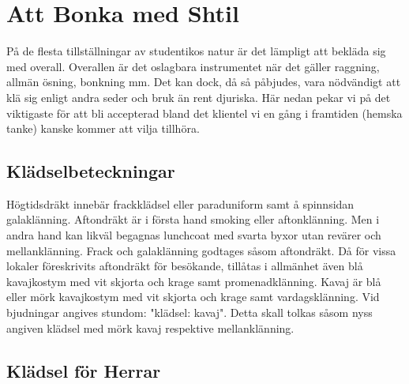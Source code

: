 
\pagestyle{Att Bonka med Shtil}

\section{\textbf{Att Bonka med Shtil}}

    På de flesta tillställningar av studentikos natur är det lämpligt att bekläda sig med overall. Overallen är det oslagbara instrumentet när det gäller raggning, allmän ösning, bonkning  mm. Det kan dock, då så påbjudes, vara nödvändigt att klä sig enligt andra seder och bruk än rent djuriska. Här nedan pekar vi på det viktigaste för att bli accepterad bland det klientel vi en gång i framtiden (hemska tanke) kanske kommer att vilja tillhöra.

    \subsection{\textbf{Klädselbeteckningar}}
    Högtidsdräkt innebär frackklädsel eller paraduniform samt å spinnsidan galaklänning. Aftondräkt är i första hand smoking eller aftonklänning. Men i andra hand kan likväl begagnas lunchcoat med svarta byxor utan revärer och mellanklänning. Frack och galaklänning godtages såsom aftondräkt. Då för vissa lokaler föreskrivits aftondräkt för besökande, tillåtas i allmänhet även blå kavajkostym med vit skjorta och krage samt promenadklänning. Kavaj är blå eller mörk kavajkostym med vit skjorta och krage samt vardagsklänning. Vid bjudningar angives stundom: "klädsel: kavaj". Detta skall tolkas såsom nyss angiven klädsel med mörk kavaj respektive mellanklänning.

    \subsection{\textbf{Klädsel för Herrar}}
